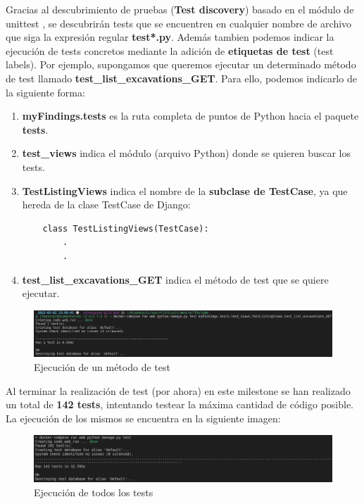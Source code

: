 Gracias al descubrimiento de pruebas (\textbf{Test discovery}) basado en el módulo de
unittest \cite{test-discovery}, se descubrirán tests que se encuentren en cualquier nombre
de archivo que siga la expresión regular \textbf{test*.py}. Además tambien podemos indicar
la ejecución de tests concretos mediante la adición de \textbf{etiquetas de test} (test
labels). Por ejemplo, supongamos que queremos ejecutar un determinado método de test
llamado \textbf{test\_list\_excavations\_GET}. Para ello, podemos indicarlo de la siguiente
forma:

    \begin{enumerate}
        \item \textbf{myFindings.tests} es la ruta completa de puntos de Python hacia el
        paquete \textbf{tests}.
        \item \textbf{test\_views} indica el módulo (arquivo Python) donde se quieren
        buscar los tests.
        \item \textbf{TestListingViews} indica el nombre de la \textbf{subclase de TestCase},
        ya que hereda de la clase TestCase de Django:
    \begin{verbatim}
    class TestListingViews(TestCase):
        .
        .
    \end{verbatim}
        \item \textbf{test\_list\_excavations\_GET} indica el método de test que se quiere
        ejecutar.
    \end{enumerate}

    \begin{figure}[H]
        \centering
        \includegraphics[scale=0.27]{imagenes/one-test.png}
        \caption{Ejecución de un método de test}
        \label{fig:one-test}
    \end{figure}

Al terminar la realización de test (por ahora) en este milestone se han realizado un total de
\textbf{142 tests}, intentando testear la máxima cantidad de código posible. La ejecución de
los mismos se encuentra en la siguiente imagen:

    \begin{figure}[H]
        \centering
        \includegraphics[scale=0.30]{imagenes/all-tests.png}
        \caption{Ejecución de todos los tests}
        \label{fig:all-tests}
    \end{figure}

